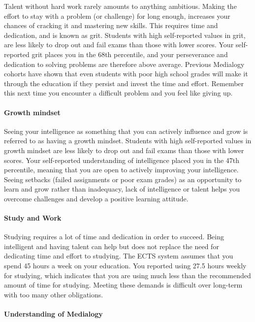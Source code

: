 \documentclass[]{article}
\let\oldparagraph\paragraph
\renewcommand{\paragraph}[1]{\oldparagraph{#1}\mbox{}}
\begin{document}
Talent without hard work rarely amounts to anything ambitious. Making
the effort to stay with a problem (or challenge) for long enough,
increases your chances of cracking it and mastering new skills. This
requires time and dedication, and is known as grit. Students with high
self-reported values in grit, are less likely to drop out and fail exams
than those with lower scores. Your self-reported grit places you in the
68th percentile, and your perseverance and dedication to solving
problems are therefore above average. Previous Medialogy cohorts have
shown that even students with poor high school grades will make it
through the education if they persist and invest the time and effort.
Remember this next time you encounter a difficult problem and you feel
like giving up.

\paragraph{Growth mindset}\label{growth-mindset}

Seeing your intelligence as something that you can actively influence
and grow is referred to as having a growth mindset. Students with high
self-reported values in growth mindset are less likely to drop out and
fail exams than those with lower scores. Your self-reported
understanding of intelligence placed you in the 47th percentile, meaning
that you are open to actively improving your intelligence. Seeing
setbacks (failed assignments or poor exam grades) as an opportunity to
learn and grow rather than inadequacy, lack of intelligence or talent
helps you overcome challenges and develop a positive learning attitude.

\paragraph{Study and Work}\label{study-and-work}

Studying requires a lot of time and dedication in order to succeed.
Being intelligent and having talent can help but does not replace the
need for dedicating time and effort to studying. The ECTS system assumes
that you spend 45 hours a week on your education. You reported using
27.5 hours weekly for studying, which indicates that you are using much
less than the recommended amount of time for studying. Meeting these
demands is difficult over long-term with too many other obligations.

\paragraph{Understanding of Medialogy}\label{understanding-of-medialogy}
\end{document}
